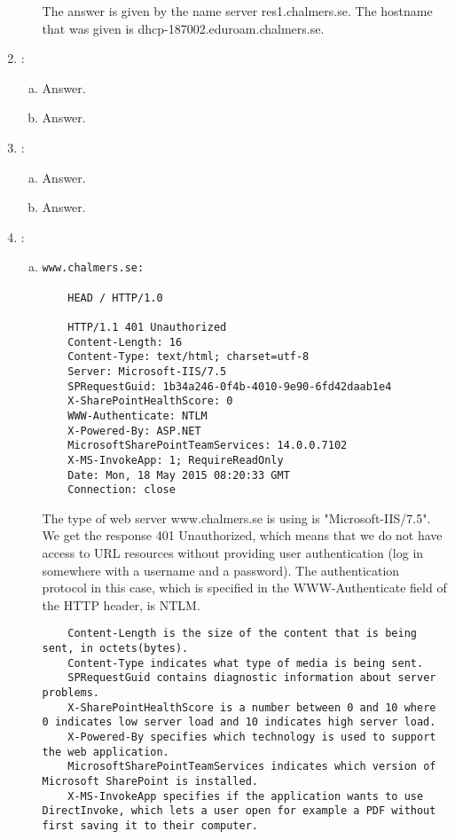 \documentclass[a4paper,9pt,fleqn]{article}
\begin{document}
\begin{enumerate}[{Task} 1]
\begin{enumerate}[a)]
The answer is given by the name server {\outp res1.chalmers.se}. The
hostname that was given is {\outp dhcp-187002.eduroam.chalmers.se}.
\end{enumerate}

\item :
\begin{enumerate}[a)]
\item 
Answer.  
\item 
Answer.
\end{enumerate}

\item :
\begin{enumerate}[a)]
\item 
Answer.  
\item 
Answer.
\end{enumerate}

\item :
\begin{enumerate}[a)]
\item
\begin{lstlisting}
www.chalmers.se:

	HEAD / HTTP/1.0

	HTTP/1.1 401 Unauthorized
	Content-Length: 16
	Content-Type: text/html; charset=utf-8
	Server: Microsoft-IIS/7.5
	SPRequestGuid: 1b34a246-0f4b-4010-9e90-6fd42daab1e4
	X-SharePointHealthScore: 0
	WWW-Authenticate: NTLM
	X-Powered-By: ASP.NET
	MicrosoftSharePointTeamServices: 14.0.0.7102
	X-MS-InvokeApp: 1; RequireReadOnly
	Date: Mon, 18 May 2015 08:20:33 GMT
	Connection: close
\end{lstlisting}	

The type of web server www.chalmers.se is using is "Microsoft-IIS/7.5".
We get the response 401 Unauthorized, which means that we do not have access
to URL resources without providing user authentication (log in somewhere with
a username and a password). The authentication protocol in this case, which
is specified in the WWW-Authenticate field of the HTTP header, is NTLM.

\begin{lstlisting}
	Content-Length is the size of the content that is being sent, in octets(bytes).
	Content-Type indicates what type of media is being sent.
	SPRequestGuid contains diagnostic information about server problems.
	X-SharePointHealthScore is a number between 0 and 10 where 0 indicates low server load and 10 indicates high server load.
	X-Powered-By specifies which technology is used to support the web application.
	MicrosoftSharePointTeamServices indicates which version of Microsoft SharePoint is installed.
	X-MS-InvokeApp specifies if the application wants to use DirectInvoke, which lets a user open for example a PDF without first saving it to their computer. 
\end{lstlisting}


\end{enumerate}
\end{enumerate}
\end{document}
